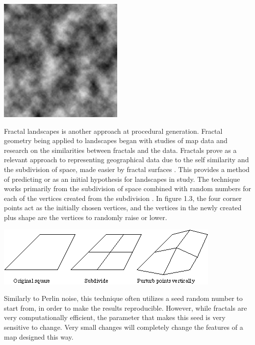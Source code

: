 \documentclass[10pt]{report}
\begin{document}
		\begin{minipage}{\textwidth}
			\centering
			\includegraphics[scale=1]{lect14-perlin}
			\label{fig:fig1}
		\end{minipage}

		Fractal landscapes is another approach at procedural generation. Fractal geometry being applied to landscapes began with studies of map data and research on the similarities between fractals and the data. Fractals prove as a relevant approach to representing geographical data due to the self similarity and the subdivision of space, made easier by fractal surfaces \cite{doi:10.1111/j.1467-8306.1987.tb00158.x}. This provides a method of predicting or as an initial hypothesis for landscapes in study. The technique works primarily from the subdivision of space combined with random numbers for each of the vertices created from the subdivision \cite{fractal-land}. In figure 1.3, the four corner points act as the initially chosen vertices, and the vertices in the newly created plus shape are the vertices to randomly raise or lower. 
		
		\begin{minipage}{\textwidth}
			\centering
			\includegraphics[scale=1]{landscapes}
			\label{fig:fig12}
		\end{minipage}
		
		Similarly to Perlin noise, this technique often utilizes a seed random number to start from, in order to make the results reproducible. However, while fractals are very computationally efficient, the parameter that makes this seed is very sensitive to change. Very small changes will completely change the features of a map designed this way.
		
\end{document}
